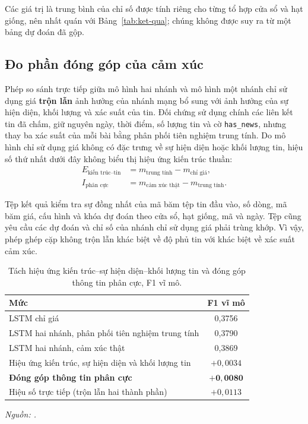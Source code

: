 \documentclass[12pt, a4paper, oneside]{report}
\begin{document}
Các giá trị là trung bình của chỉ số được tính riêng cho từng tổ hợp cửa sổ và hạt giống,
nên nhất quán với Bảng~\ref{tab:ket-qua}; chúng không được suy ra từ một bảng dự đoán
đã gộp.

\subsection{Đo phần đóng góp của cảm xúc}
\label{sec:kq-donggop}

Phép so sánh trực tiếp giữa mô hình hai nhánh và mô hình một nhánh chỉ sử dụng giá \textbf{trộn lẫn} ảnh hưởng của
nhánh mạng bổ sung với ảnh hưởng của sự hiện diện, khối lượng và xác suất của tin. Đối chứng sử dụng chính các liên
kết tin đã chấm, giữ nguyên ngày, thời điểm, số lượng tin và cờ \texttt{has\_news}, nhưng
thay ba xác suất của mỗi bài bằng phân phối tiên nghiệm trung tính. Do mô hình chỉ sử dụng giá
không có đặc trưng về sự hiện diện hoặc khối lượng tin, hiệu số thứ nhất dưới đây không biểu thị hiệu
ứng kiến trúc thuần:
\begin{align}
  E_{\text{kiến trúc--tin}} &= m_{\text{trung tính}} - m_{\text{chỉ giá}}, \\
  I_{\text{phân cực}} &= m_{\text{cảm xúc thật}} - m_{\text{trung tính}}.
\end{align}

Tệp kết quả kiểm tra sự đồng nhất của mã băm tệp tin đầu vào, số dòng, mã băm giá, cấu
hình và khóa dự đoán theo cửa sổ, hạt giống, mã và ngày. Tệp cũng yêu cầu các dự đoán và
chỉ số của nhánh chỉ sử dụng giá phải trùng khớp. Vì vậy, phép ghép cặp không trộn lẫn khác biệt về độ
phủ tin với khác biệt về xác suất cảm xúc.

\begin{table}[H]
  \centering
  \caption{Tách hiệu ứng kiến trúc--sự hiện diện--khối lượng tin và đóng góp thông tin phân cực, F1 vĩ mô.}
  \label{tab:kq-ablation}
  \begin{tabular}{p{7.6cm} c}
    \toprule
    Mức & F1 vĩ mô \\
    \midrule
    LSTM chỉ giá & 0,3756 \\
    LSTM hai nhánh, phân phối tiên nghiệm trung tính & 0,3790 \\
    LSTM hai nhánh, cảm xúc thật & 0,3869 \\
    \midrule
    Hiệu ứng kiến trúc, sự hiện diện và khối lượng tin & $+0{,}0034$ \\
    \textbf{Đóng góp thông tin phân cực} & $\mathbf{+0{,}0080}$ \\
    Hiệu số trực tiếp (trộn lẫn hai thành phần) & $+0{,}0113$ \\
    \bottomrule
  \end{tabular}
\noindent\textit{Nguồn: .}
\end{table}
\end{document}
